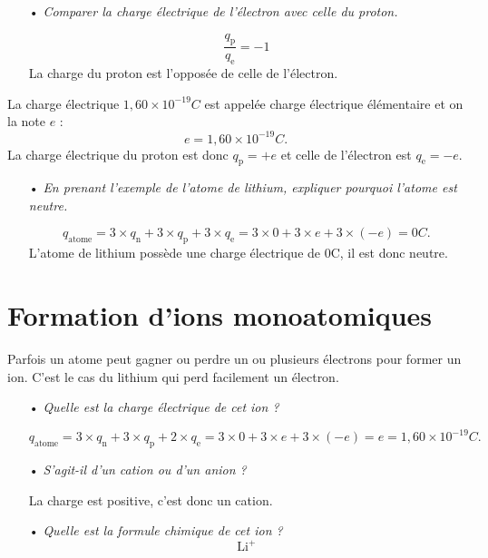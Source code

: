 \documentclass[12pt,a4paper]{article}
\begin{document}
\begin{itemize}
\item[•] \emph{Comparer la charge électrique de l'électron avec celle du proton.}

\[
\frac{q_\mathrm{p}}{q_\mathrm{e}} = -1
\]
La charge du proton est l'opposée de celle de l'électron.
\end{itemize}

La charge électrique $\unit{1{,}60\times10^{-19}}{C}$ est appelée charge électrique élémentaire et on la note $e$ :
\[
e = \unit{1{,}60\times10^{-19}}{C}.
\]
La charge électrique du proton est donc $q_\mathrm{p} = +e$ et celle de l'électron est $q_\mathrm{e} = -e$.

\begin{itemize}
\item[•] \emph{En prenant l'exemple de l'atome de lithium, expliquer pourquoi l'atome est neutre.}

\[
q_\mathrm{atome} = 3 \times q_\mathrm{n} + 3 \times q_\mathrm{p} + 3 \times q_\mathrm{e} = 3 \times 0 + 3 \times e + 3 \times (-e) = \unit{0}{C}. 
\]
L'atome de lithium possède une charge électrique de \unit{0}{C}, il est donc neutre.
\end{itemize}


\section{Formation d'ions monoatomiques}

Parfois un atome peut gagner ou perdre un ou plusieurs électrons pour former un ion.
C'est le cas du lithium qui perd facilement un électron.
\begin{itemize}
\item[•] \emph{Quelle est la charge électrique de cet ion ?}

\[
q_\mathrm{atome} = 3 \times q_\mathrm{n} + 3 \times q_\mathrm{p} + 2 \times q_\mathrm{e} = 3 \times 0 + 3 \times e + 3 \times (-e) = e = \unit{1{,}60\times10^{-19}}{C}.
\]

\item[•] \emph{S'agit-il d'un cation ou d'un anion ?}

La charge est positive, c'est donc un cation.

\item[•] \emph{Quelle est la formule chimique de cet ion ?}
\[
\text{Li}^\text{+}
\]

\end{itemize}


\end{document}
